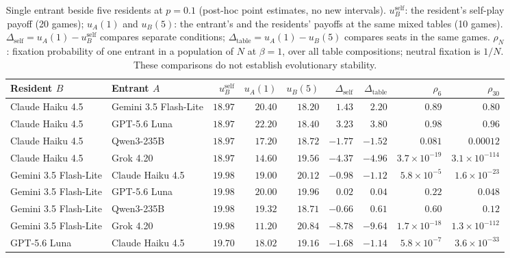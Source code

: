 
\begin{table}[!htbp]
\caption{Single entrant beside five residents at $p=0.1$ (post-hoc point estimates, no new intervals). $u_B^{\mathrm{self}}$: the resident's self-play payoff (20 games); $u_A(1)$ and $u_B(5)$: the entrant's and the residents' payoffs at the same mixed tables (10 games). $\Delta_{\mathrm{self}}=u_A(1)-u_B^{\mathrm{self}}$ compares separate conditions; $\Delta_{\mathrm{table}}=u_A(1)-u_B(5)$ compares seats in the same games. $\rho_N$: fixation probability of one entrant in a population of $N$ at $\beta=1$, over all table compositions; neutral fixation is $1/N$. These comparisons do not establish evolutionary stability.}
\label{tab:review-entrant-1}
\centering\small\setlength{\tabcolsep}{4pt}
\begin{tabular}{@{}llrrrrrrr@{}}
\toprule
Resident $B$ & Entrant $A$ & $u_B^{\mathrm{self}}$ & $u_A(1)$ & $u_B(5)$ & $\Delta_{\mathrm{self}}$ & $\Delta_{\mathrm{table}}$ & $\rho_6$ & $\rho_{30}$ \\
\midrule
Claude Haiku 4.5 & Gemini 3.5 Flash-Lite & $18.97$ & $20.40$ & $18.20$ & $1.43$ & $2.20$ & $0.89$ & $0.80$ \\
Claude Haiku 4.5 & GPT-5.6 Luna & $18.97$ & $22.20$ & $18.40$ & $3.23$ & $3.80$ & $0.98$ & $0.96$ \\
Claude Haiku 4.5 & Qwen3-235B & $18.97$ & $17.20$ & $18.72$ & $-1.77$ & $-1.52$ & $0.081$ & $0.00012$ \\
Claude Haiku 4.5 & Grok 4.20 & $18.97$ & $14.60$ & $19.56$ & $-4.37$ & $-4.96$ & $3.7\times10^{-19}$ & $3.1\times10^{-114}$ \\
\addlinespace[2pt]
Gemini 3.5 Flash-Lite & Claude Haiku 4.5 & $19.98$ & $19.00$ & $20.12$ & $-0.98$ & $-1.12$ & $5.8\times10^{-5}$ & $1.6\times10^{-23}$ \\
Gemini 3.5 Flash-Lite & GPT-5.6 Luna & $19.98$ & $20.00$ & $19.96$ & $0.02$ & $0.04$ & $0.22$ & $0.048$ \\
Gemini 3.5 Flash-Lite & Qwen3-235B & $19.98$ & $19.32$ & $18.71$ & $-0.66$ & $0.61$ & $0.60$ & $0.12$ \\
Gemini 3.5 Flash-Lite & Grok 4.20 & $19.98$ & $11.20$ & $20.84$ & $-8.78$ & $-9.64$ & $1.7\times10^{-18}$ & $1.3\times10^{-112}$ \\
\addlinespace[2pt]
GPT-5.6 Luna & Claude Haiku 4.5 & $19.70$ & $18.02$ & $19.16$ & $-1.68$ & $-1.14$ & $5.8\times10^{-7}$ & $3.6\times10^{-33}$ \\

\end{tabular}
\end{table}

